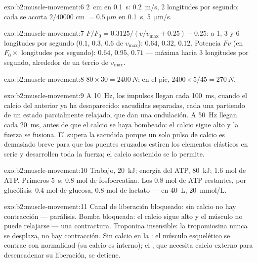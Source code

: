 \begin{solution}{exo:b2:muscle-movement:6}
\qty{2}{cm} en \qty{0.1}{s}: \qty{0.2}{m/s}, 2 longitudes por segundo;
cada  se acorta $2/\num{40000}$ cm $= \qty{0.5}{\micro m}$ en
\qty{0.1}{s}, \qty{5}{\micro m/s}.
\end{solution}

\begin{solution}{exo:b2:muscle-movement:7}
$F/F_0 = 0.3125/(v/v_{\max} + 0.25) - 0.25$: a 1, 3 y 6 longitudes por
segundo ($0.1$, $0.3$, $0.6$ de $v_{\max}$): $0.64$, $0.32$, $0.12$.
Potencia $Fv$ (en $F_0\times$ longitudes por segundo): $0.64$, $0.95$, $0.71$
--- máxima hacia 3 longitudes por segundo, alrededor de un tercio de
$v_{\max}$.
\end{solution}

\begin{solution}{exo:b2:muscle-movement:8}
$80\times 30 = \qty{2400}{N}$; en el pie, $2400\times 5/45 =
\qty{270}{N}$.
\end{solution}

\begin{solution}{exo:b2:muscle-movement:9}
A \qty{10}{Hz}, los impulsos llegan cada \qty{100}{ms}, cuando el calcio
del anterior ya ha desaparecido: sacudidas separadas, cada una partiendo
de un estado parcialmente relajado, que dan una ondulación. A
\qty{50}{Hz} llegan cada \qty{20}{ms}, antes de que el calcio se haya
bombeado: el calcio sigue alto y la fuerza se fusiona. El  supera
la sacudida porque un solo pulso de calcio es demasiado breve para que los
puentes cruzados estiren los elementos elásticos en serie y desarrollen
toda la fuerza; el calcio sostenido se lo permite.
\end{solution}

\begin{solution}{exo:b2:muscle-movement:10}
Trabajo, \qty{20}{kJ}; energía del ATP, \qty{80}{kJ}; $1.6$ mol de ATP.
Primeros \qty{5}{s}: $0.8$ mol de fosfocreatina. Los $0.8$ mol de ATP
restantes, por glucólisis: $0.4$ mol de glucosa, $0.8$ mol de lactato ---
en \qty{40}{L}, \qty{20}{mmol/L}.
\end{solution}

\begin{solution}{exo:b2:muscle-movement:11}
Canal de liberación bloqueado: sin calcio no hay contracción --- parálisis.
Bomba bloqueada: el calcio sigue alto y el músculo no puede relajarse ---
una contractura. Troponina insensible: la tropomiosina nunca se desplaza,
no hay contracción. Sin calcio en la : el músculo esquelético se
contrae con normalidad (su calcio es interno); el , que necesita
calcio externo para desencadenar su liberación, se detiene.
\end{solution}

